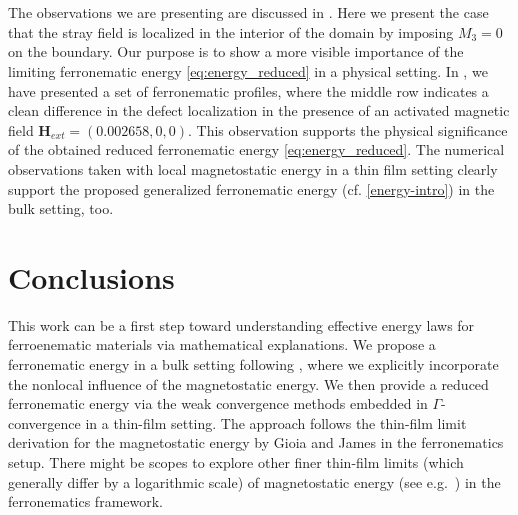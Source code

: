 \documentclass{article}
\newtheorem{remark}[theorem]{Remark}
\def\Hvec{\mathbf{H}}
\begin{document}
\\
\\
The observations we are presenting  are discussed in \cite{dutta2025study, dutta2026existence}. Here we present the case that the stray field is localized in the interior of the domain by imposing $M_3=0$ on the boundary. Our purpose is to show a more visible importance of the limiting ferronematic energy \eqref{eq:energy_reduced} in a physical setting.
In , we have presented a set of ferronematic profiles, where the middle row indicates a clean difference in the defect localization in the presence of an activated magnetic field $\Hvec_{ext}=\left(0.002658, 0, 0\right)$. This observation supports the physical significance of the obtained reduced ferronematic energy \eqref{eq:energy_reduced}. The numerical observations taken with local magnetostatic energy in a thin film setting clearly support the proposed generalized ferronematic energy (cf. \eqref{energy-intro}) in the bulk setting, too.
\section{Conclusions}\label{conclusions}
This work can be a first step toward understanding effective energy laws for ferroenematic materials via mathematical explanations. We propose a ferronematic energy in a bulk setting following \cite{Mertelj}, where we explicitly incorporate the nonlocal influence of the magnetostatic energy. We then provide a reduced ferronematic energy via the weak convergence methods embedded in $\Gamma$-convergence in a thin-film setting. The approach follows the thin-film limit derivation for the magnetostatic energy by Gioia and James \cite{Giogia} in the ferronematics setup. There might be scopes to explore other finer thin-film limits (which generally differ by a logarithmic scale) of magnetostatic energy (see e.g.\ \cite{desimone2004recent}) in the ferronematics framework.  
\end{document}
